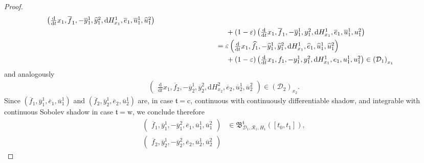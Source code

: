 \documentclass[preprint,12pt]{elsarticle}
\theoremstyle{definition}
\begin{document}
\begin{proof}
\begin{align*}
\begin{pmatrix}
\tfrac{\mathrm{d}}{\mathrm{d}t}x_1,\overline{f}_1,-\overline{y}_1^1,\widehat{y}_1^2,\mathrm{d}H^1_{x_1},\overline{e}_1,\overline{u}_1^1,\widehat{u}_1^2
\end{pmatrix}\\
& \hspace{3.5cm} + (1-\varepsilon)\begin{pmatrix}
\tfrac{\mathrm{d}}{\mathrm{d}t}x_1,\overline{f}_1,-\overline{y}_1^1,{y}_1^2,\mathrm{d}H^1_{x_1},\overline{e}_1,\overline{u}_1^1,{u}_1^2
\end{pmatrix}\\
& \hspace{3cm} = \varepsilon\begin{pmatrix}
\tfrac{\mathrm{d}}{\mathrm{d}t}x_1,\widehat{f}_1,-\widehat{y}_1^1,\widehat{y}_1^2,\mathrm{d}H^1_{x_1},\widehat{e}_1,\widehat{u}_1^1,\widehat{u}_1^2
\end{pmatrix}\\
& \hspace{3.5cm} + (1-\varepsilon)\begin{pmatrix}
\tfrac{\mathrm{d}}{\mathrm{d}t}x_1,{f}_1,-{y}_1^1,{y}_1^2,\mathrm{d}H^1_{x_1},{e}_1,{u}_1^1,{u}_1^2
\end{pmatrix}\in\left(\mathcal{D}_1\right)_{x_1}
\end{align*}
and analogously
\begin{align*}
\begin{pmatrix}
\tfrac{\mathrm{d}}{\mathrm{d}t}x_1,\overline{f}_2,-\overline{y}_2^1,\overline{y}_2^2,\mathrm{d}H^2_{x_2},\overline{e}_2,\overline{u}_2^1,\overline{u}_2^2
\end{pmatrix} \in\left(\mathcal{D}_2\right)_{x_2}.
\end{align*}
Since $(\overline{f}_1,\overline{y}_1^1,\overline{e}_1,\overline{u}_1^1)$ and $(\overline{f}_2,\overline{y}_2^1,\overline{e}_2,\overline{u}_2^1)$ are, in case $\mathfrak{t} = \mathrm{c}$, continuous with continuously differentiable shadow, and integrable with continuous Sobolev shadow in case $\mathfrak{t} = \mathrm{w}$, we conclude therefore
\begin{align*}
\begin{pmatrix}
\overline{f}_1,\overline{y}_1^1,-\overline{y}_1^2,\overline{e}_1,\overline{u}_1^1,\overline{u}_1^2
\end{pmatrix} & \in \mathfrak{B}^{\mathfrak{t}}_{\mathcal{D}_1,\mathcal{R}_1,H_1}([t_0,t_1]),\\
\begin{pmatrix}
\overline{f}_2,\overline{y}_2^1,-\overline{y}_2^2,\overline{e}_2,\overline{u}_2^1,\overline{u}_2^2

\end{pmatrix}
\end{align*}
\end{proof}
\end{document}
